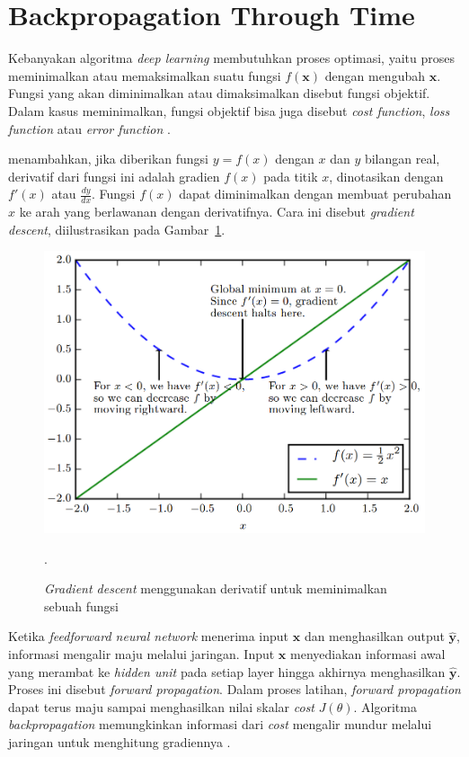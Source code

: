 \section{Backpropagation Through Time}
Kebanyakan algoritma \textit{deep learning} membutuhkan proses optimasi, yaitu proses meminimalkan atau memaksimalkan suatu fungsi $f(\pmb{x})$ dengan mengubah $\pmb{x}$. Fungsi yang akan diminimalkan atau dimaksimalkan disebut fungsi objektif. Dalam kasus meminimalkan, fungsi objektif bisa juga disebut \textit{cost function}, \textit{loss function} atau \textit{error function} \citep{goodfellow-2016}.

\citeauthor{goodfellow-2016} menambahkan, jika diberikan fungsi $y = f(x)$ dengan $x$ dan $y$ bilangan real, derivatif dari fungsi ini adalah gradien $f(x)$ pada titik $x$, dinotasikan dengan $f'(x)$ atau $\frac{dy}{dx}$. Fungsi $f(x)$ dapat diminimalkan dengan membuat perubahan $x$ ke arah yang berlawanan dengan derivatifnya. Cara ini disebut \textit{gradient descent}, diilustrasikan pada Gambar~\ref{gambar:gradient-descent}.

\begin{figure}
    \centering
    \includegraphics[width=12cm]{gambar/landasan-teori/gradient-descent.png}
    \caption{\textit{Gradient descent} menggunakan derivatif untuk meminimalkan sebuah fungsi \citep{goodfellow-2016}}.
    \label{gambar:gradient-descent}
\end{figure}

Ketika \textit{feedforward neural network} menerima input $\pmb{x}$ dan menghasilkan output $\pmb{\hat{y}}$, informasi mengalir maju melalui jaringan. Input $\pmb{x}$ menyediakan informasi awal yang merambat ke \textit{hidden unit} pada setiap layer hingga akhirnya menghasilkan $\pmb{\hat{y}}$. Proses ini disebut \textit{forward propagation}. Dalam proses latihan, \textit{forward propagation} dapat terus maju sampai menghasilkan nilai skalar \textit{cost} $J(\theta)$. Algoritma \textit{backpropagation} memungkinkan informasi dari \textit{cost} mengalir mundur melalui jaringan untuk menghitung gradiennya \citep{goodfellow-2016}.

